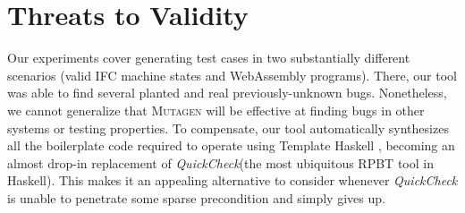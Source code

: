 \documentclass[sigconf,review,anonymous]{acmart}
\newcommand{\quickcheck}{\textit{QuickCheck}\xspace}
\newcommand{\mutagen}{\textsc{Mutagen}\xspace}
\begin{document}





\section{Threats to Validity}
\label{sec:threats}

Our experiments cover generating test cases in two substantially different
scenarios (valid IFC machine states and WebAssembly programs). 
%
There, our tool was able to find several planted and real previously-unknown
bugs. 
%
Nonetheless, we cannot generalize that \mutagen will be effective at finding
bugs in other systems or testing properties. 
%
To compensate, our tool automatically synthesizes all the boilerplate code
required to operate using Template Haskell \cite{SheardJ02}, becoming an almost
drop-in replacement of \quickcheck (the most ubiquitous RPBT tool in Haskell). 
%     
This makes it an appealing alternative to consider whenever \quickcheck is
unable to penetrate some sparse precondition and simply gives up. 
\end{document}

